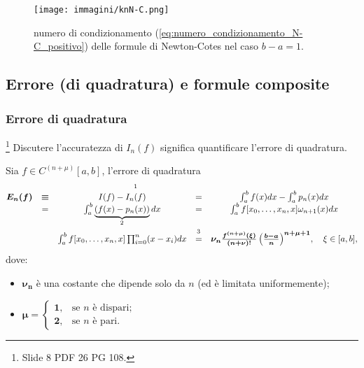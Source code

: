 \begin{figure}[H]
    \centering
    \texttt{[image: immagini/knN-C.png]}
    \caption{numero di condizionamento (\ref{eq:numero_condizionamento_N-C_positivo}) delle formule di Newton-Cotes nel caso $b-a=1$.}\label{fig:knN-C}
\end{figure}

\subsection{Errore (di quadratura) e formule composite}
\subsubsection{Errore di quadratura}
\footnote{Slide 8 PDF 26 PG 108.} Discutere l'accuratezza di $I_n(f)$ significa quantificare l'errore di quadratura.
\begin{definition}
	Sia $f\in C^{(n+\mu)}[a,b]$, l'errore di quadratura 
	\begin{equation}\label{eq:errore_quadratura}
	    \begin{matrix}
	        \boldsymbol{E_n(f)}&\boldsymbol{\equiv}& I(f)-\overset{\footnotemark}{I_n(f)}&=&\int_a^b f(x)dx-\int_a^bp_n(x)dx\\
	        &=&\int_a^b\underbrace{(f(x)-p_n(x))}_{\footnotemark}dx&=&\int_a^bf[x_0,\hdots,x_n,x]\omega_{n+1}(x)dx\\
	        &&\int_a^bf[x_0,\hdots,x_n,x]\prod_{i=0}^n(x-x_i)dx&\overset{\footnotemark}{=}&\boldsymbol{\nu_n \frac{f^{(n+\mu)}(\xi)}{(n+\nu)!}\left(\frac{b-a}{n}\right)^{n+\mu+1}},\quad\xi\in [a,b],
	    \end{matrix}
	\end{equation}
	\noindent dove:
	\begin{itemize}
		\item $\boldsymbol{\nu_n}$ è una costante che dipende solo da $n$ (ed è limitata uniformemente);
		\item $\boldsymbol{\mu}=
		\begin{cases}
			\boldsymbol 1, &\text{se $n$ è dispari;}\\
			\boldsymbol 2, &\text{se $n$ è pari.}
		\end{cases}$
	\end{itemize}
\end{definition}
\addtocounter{footnote}{-2}

